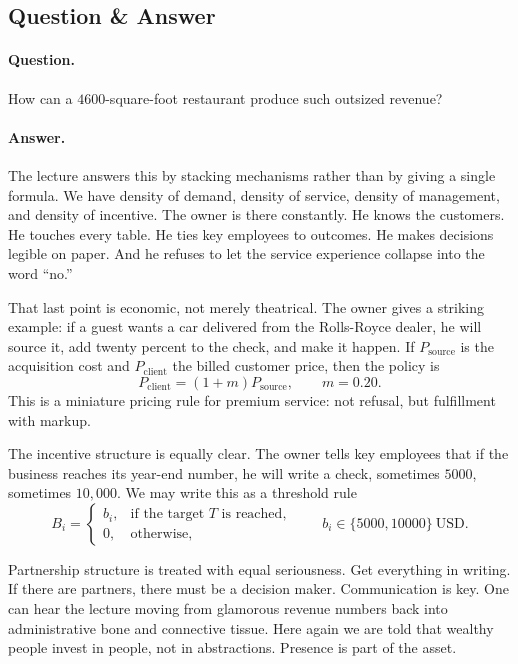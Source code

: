 \subsection{Question \& Answer}

\paragraph{Question.} How can a \(4600\)-square-foot restaurant produce such outsized revenue?

\paragraph{Answer.} The lecture answers this by stacking mechanisms rather than by giving a single formula. We have density of demand, density of service, density of management, and density of incentive. The owner is there constantly. He knows the customers. He touches every table. He ties key employees to outcomes. He makes decisions legible on paper. And he refuses to let the service experience collapse into the word ``no.''

That last point is economic, not merely theatrical. The owner gives a striking example: if a guest wants a car delivered from the Rolls-Royce dealer, he will source it, add twenty percent to the check, and make it happen. If \(P_{\mathrm{source}}\) is the acquisition cost and \(P_{\mathrm{client}}\) the billed customer price, then the policy is
\begin{equation}
P_{\mathrm{client}}=(1+m)P_{\mathrm{source}},
\qquad
m=0.20.
\end{equation}
This is a miniature pricing rule for premium service: not refusal, but fulfillment with markup.

The incentive structure is equally clear. The owner tells key employees that if the business reaches its year-end number, he will write a check, sometimes \(5000\), sometimes \(10{,}000\). We may write this as a threshold rule
\begin{equation}
B_i=
\begin{cases}
b_i, & \text{if the target }T\text{ is reached},\\
0, & \text{otherwise},
\end{cases}
\qquad
b_i\in\{5000,10000\}\ \text{USD}.
\end{equation}

Partnership structure is treated with equal seriousness. Get everything in writing. If there are partners, there must be a decision maker. Communication is key. One can hear the lecture moving from glamorous revenue numbers back into administrative bone and connective tissue. Here again we are told that wealthy people invest in people, not in abstractions. Presence is part of the asset.

